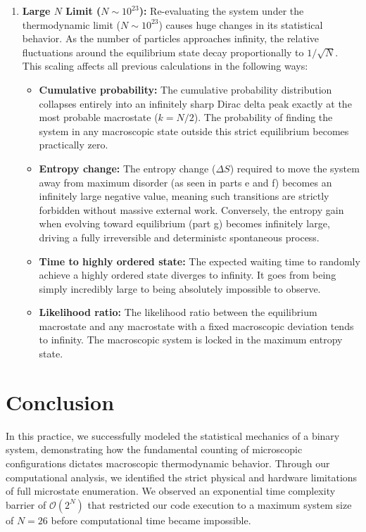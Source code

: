 \documentclass[11pt, a4paper]{article}
\begin{document}
\begin{enumerate}[label=\alph*)]
    \item \textbf{Large $N$ Limit ($N \sim 10^{23}$):}
    Re-evaluating the system under the thermodynamic limit ($N \sim 10^{23}$) causes huge changes in its statistical behavior. As the number of particles approaches infinity, the relative fluctuations around the equilibrium state decay proportionally to $1/\sqrt{N}$. This scaling affects all previous calculations in the following ways:
    
    \begin{itemize}
        \item \textbf{Cumulative probability:} The cumulative probability distribution collapses entirely into an infinitely sharp Dirac delta peak exactly at the most probable macrostate ($k = N/2$). The probability of finding the system in any macroscopic state outside this strict equilibrium becomes practically zero.
        \item \textbf{Entropy change:} The entropy change ($\Delta S$) required to move the system away from maximum disorder (as seen in parts e and f) becomes an infinitely large negative value, meaning such transitions are strictly forbidden without massive external work. Conversely, the entropy gain when evolving toward equilibrium (part g) becomes infinitely large, driving a fully irreversible and deterministc spontaneous process.
        \item \textbf{Time to highly ordered state:} The expected waiting time to randomly achieve a highly ordered state diverges to infinity. It goes from being simply incredibly large to being absolutely impossible to observe.
        \item \textbf{Likelihood ratio:} The likelihood ratio between the equilibrium macrostate and any macrostate with a fixed macroscopic deviation tends to infinity. The macroscopic system is locked in the maximum entropy state.
    \end{itemize}
\end{enumerate}



\section{Conclusion}
In this practice, we successfully modeled the statistical mechanics of a binary system, demonstrating how the fundamental counting of microscopic configurations dictates macroscopic thermodynamic behavior. Through our computational analysis, we identified the strict physical and hardware limitations of full microstate enumeration. We observed an exponential time complexity barrier of $\mathcal{O}(2^N)$ that restricted our code execution to a maximum system size of $N = 26$ before computational time became impossible. 
\end{document}
